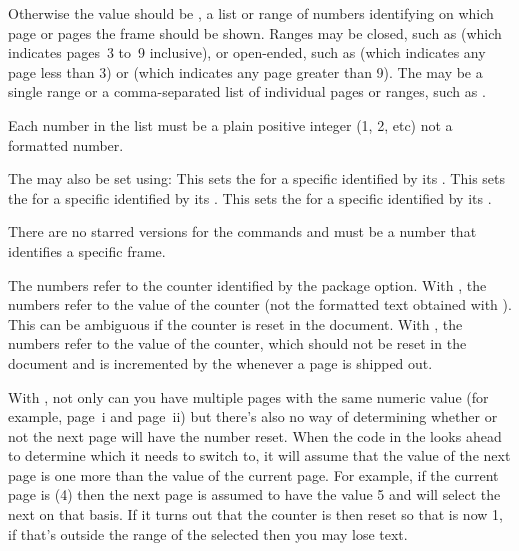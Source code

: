\documentclass[fontsize=12pt]{scrbook}
\begin{document}
Otherwise the value should be ,
a list or range of numbers identifying on which page or pages the
frame should be shown.
Ranges may be closed, such as  (which indicates pages~3
to~9 inclusive), or open-ended, such as  (which indicates
any page less than 3) or  (which indicates any page
greater than 9). The  may be a single range or a
comma-separated list of individual pages or ranges, such as
.

\begin{important}
Each number in the list must be a plain positive integer (1, 2, etc) not a formatted number.
\end{important}

The  may also be set using:
This sets the  for a specific 
identified by its .
This sets the  for a specific 
identified by its .
This sets the  for a specific 
identified by its .

\begin{important}
There are no starred versions for the 
 commands and  must be a
number that identifies a specific frame.
\end{important}

The numbers refer to the counter identified by the 
package option. With , the numbers
refer to the value of the  counter (not the formatted text
obtained with ).  This can be ambiguous if the
 counter is reset in the document. With
, the numbers refer to the value of the
 counter, which should not be reset in the
document and is incremented by the  whenever a page is
shipped out.

\begin{warning}
With , not only can you have multiple
pages with the same numeric value (for example, page~i and page~ii)
but there's also no way of determining whether or not the next page
will have the number reset. When the  code in the
 looks ahead to determine which  it
needs to switch to, it will assume that the value of the next page
is one more than the value of the current page. For example, if the
current page is  (4) then the next page is assumed to have the
value 5 and  will select the next  on that basis.
If it turns out that the  counter is then reset so that
 is now 1, if that's outside the range of the selected
 then you may lose text.
\end{warning}
\end{document}
